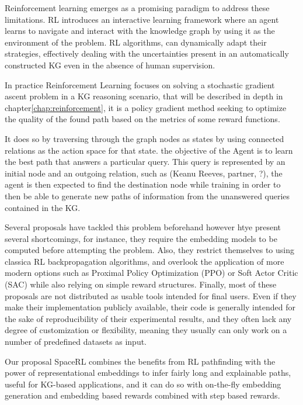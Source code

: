 Reinforcement learning emerges as a promising paradigm to address these limitations. RL introduces an interactive learning framework where an agent learns to navigate and interact with the knowledge graph by using it as the environment of the problem. RL algorithms, can dynamically adapt their strategies, effectively dealing with the uncertainties present in an automatically constructed KG even in the absence of human supervision.

In practice Reinforcement Learning focuses on solving a stochastic gradient ascent problem in a KG reasoning scenario, that will be described in depth in chapter\ref{chap:reinforcement}, it is a policy gradient method seeking to optimize the quality of the found path based on the metrics of some reward functions. 

It does so by traversing through the graph nodes as states by using connected relations as the action space for that state. the objective of the Agent is to learn the best path that answers a particular query. This query is represented by an initial node and an outgoing relation, such as (Keanu Reeves, partner, ?), the agent is then expected to find the destination node while training in order to then be able to generate new paths of information from the unanswered queries contained in the KG.

Several proposals have tackled this problem beforehand \cite{xiong2017deeppath, das2017go, lin2018multi, xian2019reinforcement} however htye present several shortcomings, for instance, they require the embedding models to be computed before attempting the problem. Also, they restrict themselves to using classica RL backpropagation algorithms, and overlook the application of more modern options such as Proximal Policy Optimization (PPO)\cite{schulman2017proximal} or Soft Actor Critic (SAC) \cite{haarnoja2018soft} while also relying on simple reward structures. Finally, most of these proposals are not distributed as usable tools intended for final users. Even if they make their implementation publicly available, their code is generally intended for the sake of reproducibility of their experimental results, and they often lack any degree of customization or flexibility, meaning they usually can only work on a number of predefined datasets as input.

Our proposal SpaceRL combines the benefits from RL pathfinding with the power of representational embeddings to infer fairly long and explainable paths, useful for KG-based applications, and it can do so with on-the-fly embedding generation and embedding based rewards combined with step based rewards.


